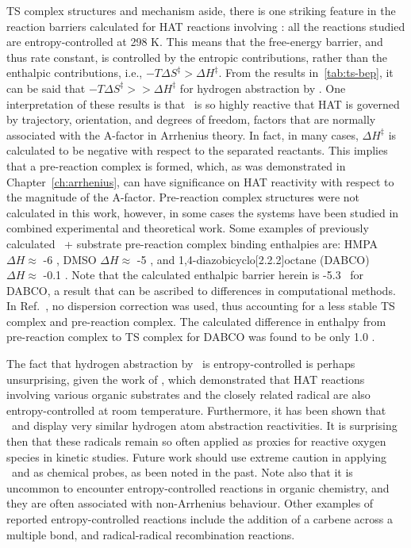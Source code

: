 TS complex structures and mechanism aside, there is one striking feature in the
reaction barriers calculated for HAT reactions involving \cumo: all the
reactions studied are entropy-controlled at 298 K. This means that the
free-energy barrier, and thus rate constant, is controlled by the entropic
contributions, rather than the enthalpic contributions, i.e., $-T\Delta
S^\ddagger > \Delta H^\ddagger$. From the results in~\ref{tab:ts-bep}, it can
be said that $-T\Delta S^\ddagger >> \Delta H^\ddagger$ for hydrogen
abstraction by \cumo. One interpretation of these results is that \cumo\ is so
highly reactive that HAT is governed by trajectory, orientation, and degrees of
freedom, factors that are normally associated with the A-factor in Arrhenius
theory. In fact, in many cases, $\Delta H^\ddagger$ is calculated to be
negative with respect to the separated reactants. This implies that a
pre-reaction complex is formed, which, as was demonstrated in
Chapter~\ref{ch:arrhenius}, can have significance on HAT reactivity with
respect to the magnitude of the A-factor. Pre-reaction complex structures were
not calculated in this work, however, in some cases the systems have been
studied in combined experimental and theoretical work. Some examples of
previously calculated \cumo\ + substrate pre-reaction complex binding
enthalpies are: HMPA\footnotemark\ $\Delta H \approx$ -6 \kcalmol, DMSO $\Delta
H \approx$ -5 \kcalmol, and 1,4-diazobicyclo[2.2.2]octane
(DABCO)\cite{Salamone2011b} $\Delta H \approx$ -0.1 \kcalmol. Note that the
calculated enthalpic barrier herein is -5.3 \kcalmol\ for DABCO, a result that
can be ascribed to differences in computational methods. In
Ref.~, no dispersion correction was used, thus
accounting for a less stable TS complex and pre-reaction complex. The
calculated difference in enthalpy from pre-reaction complex to TS complex for
DABCO was found to be only 1.0 \kcalmol.


The fact that hydrogen abstraction by \cumo\ is entropy-controlled is perhaps
unsurprising, given the work of \citet{Finn2004}, which demonstrated that HAT
reactions involving various organic substrates and the closely related radical
 are also entropy-controlled at room temperature. Furthermore, it
has been shown that \cumo\ and  display very similar hydrogen
atom abstraction reactivities.\cite{Salamone2011, Valgimigli1995, Sheeller2001,
Baignee1983} It is surprising then that these radicals remain so often applied
as proxies for reactive oxygen species in kinetic studies. Future work should
use extreme caution in applying \cumo\ and  as chemical probes,
as been noted in the past.\cite{Finn2004, Salamone2011b, Salamone2011} Note
also that it is uncommon to encounter entropy-controlled reactions in organic
chemistry, and they are often associated with non-Arrhenius behaviour. Other
examples of reported entropy-controlled reactions include the addition of a
carbene across a multiple bond,\cite{Houk1984, Moss2017} and radical-radical
recombination reactions.\cite{Sobek2001}

